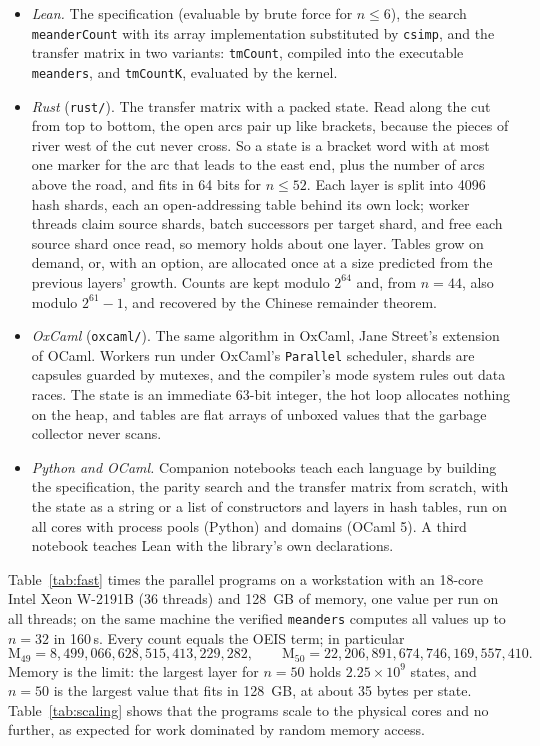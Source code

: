 \documentclass[11pt]{amsart}
\theoremstyle{definition}
\theoremstyle{remark}
\newcommand{\Open}{\mathrm{M}}
\newcommand{\code}[1]{\texttt{#1}}
\begin{document}
\begin{itemize}
  \item \emph{Lean.} The specification (evaluable by brute force for $n \le 6$), the search
    \code{meanderCount} with its array implementation substituted by \code{csimp}, and the
    transfer matrix in two variants: \code{tmCount}, compiled into the executable
    \code{meanders}, and \code{tmCountK}, evaluated by the kernel.
  \item \emph{Rust} (\code{rust/}). The transfer matrix with a packed state. Read along the cut
    from top to bottom, the open arcs pair up like brackets, because the pieces of river west of
    the cut never cross. So a state is a bracket word with at most one marker for the arc that
    leads to the east end, plus the number of arcs above the road, and fits in 64 bits for
    $n \le 52$. Each layer is split into 4096 hash shards, each an open-addressing table behind
    its own lock; worker threads claim source shards, batch successors per target shard, and
    free each source shard once read, so memory holds about one layer. Tables grow on demand, or,
with an option, are allocated once at a size predicted from the previous layers' growth. Counts
are kept modulo
    $2^{64}$ and, from $n = 44$, also modulo $2^{61}-1$, and recovered by the Chinese
    remainder theorem.
  \item \emph{OxCaml} (\code{oxcaml/}). The same algorithm in OxCaml, Jane Street's extension of
    OCaml. Workers run under OxCaml's \code{Parallel} scheduler, shards are capsules guarded by
    mutexes, and the compiler's mode system rules out data races. The state is an immediate
    63-bit integer, the hot loop allocates nothing on the heap, and tables are flat arrays of
    unboxed values that the garbage collector never scans.
  \item \emph{Python and OCaml.} Companion notebooks teach each language by building the
    specification, the parity search and the transfer matrix from scratch, with the state as
    a string or a list of constructors and layers in hash tables, run on all cores with process
    pools (Python) and domains (OCaml 5). A third notebook teaches Lean with the library's own
    declarations.
\end{itemize}

Table~\ref{tab:fast} times the parallel programs on a workstation with an 18-core Intel Xeon
W-2191B (36 threads) and 128~GB of memory, one value per run on all threads; on the same
machine the verified \code{meanders} computes all values up to $n=32$ in 160\,s. Every count
equals the OEIS term; in particular
\[
  \Open_{49} = 8{,}499{,}066{,}628{,}515{,}413{,}229{,}282, \qquad
  \Open_{50} = 22{,}206{,}891{,}674{,}746{,}169{,}557{,}410.
\]
Memory is the limit: the largest layer for $n = 50$ holds $2.25 \times 10^9$ states, and $n = 50$
is the largest value that fits in 128~GB, at about 35 bytes per state. Table~\ref{tab:scaling}
shows that the programs scale to the physical cores and no further, as expected for work
dominated by random memory access.
\end{document}
